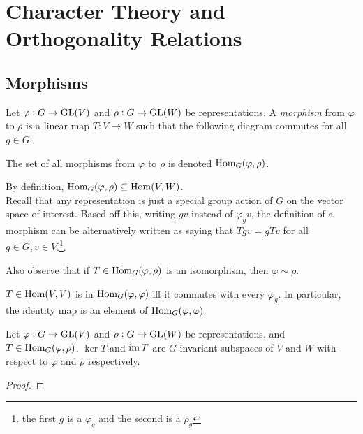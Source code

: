 \section{Character Theory and Orthogonality Relations}

	\subsection{Morphisms}

		\begin{fdef}[Morphism]
			Let $\varphi : G \to \operatorname{GL}(V)$ and $\rho : G \to \operatorname{GL}(W)$ be representations. A \emph{morphism} from $\varphi$ to $\rho$ is a linear map $T : V \to W$ such that the following diagram commutes for all $g \in G$.
			\begin{center}
			\end{center}
			The set of all morphisms from $\varphi$ to $\rho$ is denoted $\operatorname{Hom}_G(\varphi,\rho)$.
		\end{fdef}

		By definition, $\operatorname{Hom}_G(\varphi,\rho) \subseteq \operatorname{Hom}(V,W)$.\\

		Recall that any representation is just a special group action of $G$ on the vector space of interest. Based off this, writing $gv$ instead of $\varphi_g v$, the definition of a morphism can be alternatively written as saying that $Tgv = gTv$ for all $g\in G, v \in V$.\footnote{the first $g$ is a $\varphi_g$ and the second is a $\rho_g$}.

		Also observe that if $T \in \operatorname{Hom}_G(\varphi,\rho)$ is an isomorphism, then $\varphi \sim \rho$.

		\begin{remark}
			$T \in \operatorname{Hom}(V,V)$ is in $\operatorname{Hom}_G(\varphi,\varphi)$ iff it commutes with every $\varphi_g$. In particular, the identity map is an element of $\operatorname{Hom}_G(\varphi,\varphi)$.
		\end{remark}

		\begin{fprop}
			Let $\varphi : G \to \operatorname{GL}(V)$ and $\rho : G \to \operatorname{GL}(W)$ be representations, and $T \in \operatorname{Hom}_G(\varphi,\rho)$. $\ker T$ and $\operatorname{im} T$ are $G$-invariant subspaces of $V$ and $W$ with respect to $\varphi$ and $\rho$ respectively.
		\end{fprop}
		\begin{proof}
			
		\end{proof}